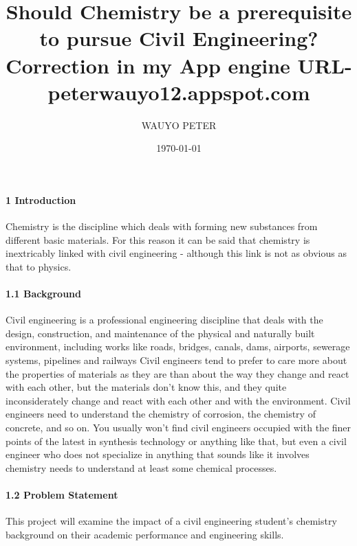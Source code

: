 \documentclass[10pt,a4paper]{article}
\title{%
Should Chemistry be a prerequisite to pursue Civil Engineering? \\
\large Correction in my App engine URL-\textbf{peterwauyo12.appspot.com} }
\author{WAUYO PETER}
\date{\today}
\begin{document}
\maketitle

\paragraph{1 Introduction}
\begin{flushleft}
Chemistry is the discipline which deals with forming new substances from different basic materials. For this reason it can be said that chemistry is inextricably linked with civil engineering - although this link is not as obvious as that to physics.
\end{flushleft}

\paragraph{1.1 Background}
\begin{flushleft}
Civil engineering is a professional engineering discipline that deals with the design, construction, and maintenance of the physical and naturally built environment, including works like roads, bridges, canals, dams, airports, sewerage systems, pipelines and railways
\newline
\newline
Civil engineers tend to prefer to care more about the properties of materials as they are than about the way they change and react with each other, but the materials don't know this, and they quite inconsiderately change and react with each other and with the environment. Civil engineers need to understand the chemistry of corrosion, the chemistry of concrete, and so on. You usually won't find civil engineers occupied with the finer points of the latest in synthesis technology or anything like that, but even a civil engineer who does not specialize in anything that sounds like it involves chemistry needs to understand at least some chemical processes.
\end{flushleft}

\paragraph{1.2 Problem Statement}
\begin{flushleft}
This project will examine the impact of a civil engineering student’s chemistry background on their academic performance and engineering skills.
\end{flushleft}
\end{document}
